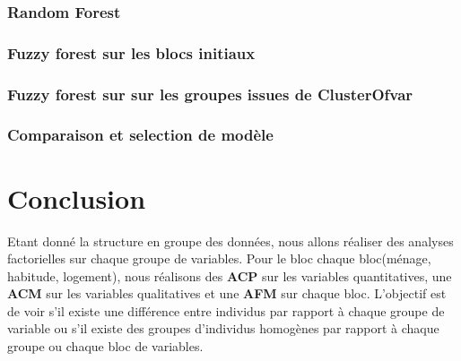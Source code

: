 \documentclass[11pt,a4paper, x11names]{article}\usepackage[]{graphicx}\usepackage[]{color}
\begin{document}
\subsubsection{Random  Forest}
\subsubsection{Fuzzy forest sur les blocs initiaux}
\subsubsection{Fuzzy forest sur sur les groupes issues de ClusterOfvar}
\subsubsection{Comparaison et selection de modèle}
\section{Conclusion}





\par Etant donné la structure en groupe des données, nous allons réaliser des analyses factorielles sur
chaque groupe de variables. Pour le bloc chaque bloc(ménage, habitude, logement), nous réalisons des \textbf{ACP} sur les variables quantitatives, une \textbf{ACM} sur les variables qualitatives et une \textbf{AFM} sur chaque bloc. L'objectif est de voir s'il existe une différence entre individus par rapport à chaque groupe de variable ou s'il existe des groupes d'individus homogènes par rapport à chaque groupe ou chaque bloc de variables.
\end{document}
